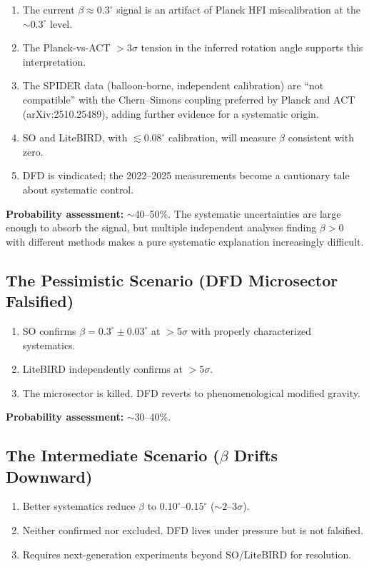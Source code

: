 \documentclass[11pt]{article}
\newcommand{\CS}{Chern--Simons}
\begin{document}
\begin{enumerate}
\item The current $\beta \approx 0.3^\circ$ signal is an artifact
  of Planck HFI miscalibration at the $\sim 0.3^\circ$ level.
\item The Planck-vs-ACT $>3\sigma$ tension in the inferred
  rotation angle supports this interpretation.
\item The SPIDER data (balloon-borne, independent calibration)
  are ``not compatible'' with the \CS{} coupling preferred by
  Planck and ACT (arXiv:2510.25489), adding further evidence
  for a systematic origin.
\item SO and LiteBIRD, with $\lesssim 0.08^\circ$ calibration,
  will measure $\beta$ consistent with zero.
\item DFD is vindicated; the 2022--2025 measurements become a
  cautionary tale about systematic control.
\end{enumerate}

\textbf{Probability assessment:} $\sim$40--50\%.  The systematic
uncertainties are large enough to absorb the signal, but multiple
independent analyses finding $\beta > 0$ with different methods
makes a pure systematic explanation increasingly difficult.

\subsection{The Pessimistic Scenario (DFD Microsector Falsified)}

\begin{enumerate}
\item SO confirms $\beta = 0.3^\circ \pm 0.03^\circ$ at $>5\sigma$
  with properly characterized systematics.
\item LiteBIRD independently confirms at $>5\sigma$.
\item The microsector is killed.  DFD reverts to phenomenological
  modified gravity.
\end{enumerate}

\textbf{Probability assessment:} $\sim$30--40\%.

\subsection{The Intermediate Scenario ($\beta$ Drifts Downward)}

\begin{enumerate}
\item Better systematics reduce $\beta$ to $0.10^\circ$--$0.15^\circ$
  ($\sim 2$--$3\sigma$).
\item Neither confirmed nor excluded.  DFD lives under pressure
  but is not falsified.
\item Requires next-generation experiments beyond SO/LiteBIRD for
  resolution.
\end{enumerate}
\end{document}
